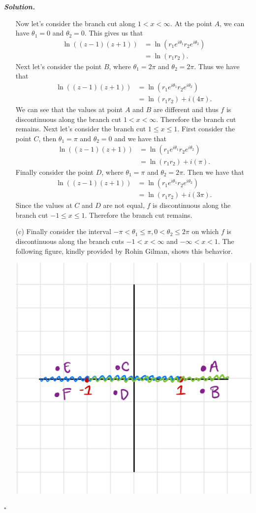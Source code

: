 \documentclass[12pt]{report}
\newenvironment{solution}[1][\it{Solution}]{\textbf{#1. } }{$\square$}
\begin{document}
\begin{solution}
\begin{enumerate}
        Now let's consider the branch cut along $1 < x < \infty$. At the point $A$, we can have $\theta_1 = 0$ and $\theta_2 = 0$. This gives us that
        \begin{align*}
            \ln((z-1)(z+1)) &= \ln(r_1e^{i\theta_1}r_2e^{i\theta_2})\\
            &=\ln(r_1r_2).
        \end{align*}
        Next let's consider the point $B$, where $\theta_1 = 2\pi$ and $\theta_2 = 2\pi$. Thus we have that
        \begin{align*}
            \ln((z-1)(z+1)) &= \ln(r_1e^{i\theta_1}r_2e^{i\theta_2})\\
            &=\ln(r_1r_2) + i(4\pi).
        \end{align*}
        We can see that the values at point $A$ and $B$ are different and thus $f$ is discontinuous along the branch cut $1 < x < \infty$. Therefore the branch cut remains.  Next let's consider the branch cut $1 \leq x \leq 1$. First consider the point $C$, then $\theta_1 = \pi$ and $\theta_2 = 0$ and we have that
        \begin{align*}
            \ln((z-1)(z+1)) &= \ln(r_1e^{i\theta_1}r_2e^{i\theta_2})\\
            &=\ln(r_1r_2) + i(\pi).
        \end{align*}
        Finally consider the point $D$, where $\theta_1 = \pi$ and $\theta_2 = 2\pi$. Then we have that
        \begin{align*}
            \ln((z-1)(z+1)) &= \ln(r_1e^{i\theta_1}r_2e^{i\theta_2})\\
            &=\ln(r_1r_2) + i(3\pi).
        \end{align*}
        Since the values at $C$ and $D$ are not equal, $f$ is discontinuous along the branch cut $-1\leq x\leq 1$. Therefore the branch cut remains. 


        \item [(c)]
        Finally consider the interval $-\pi < \theta_1 \leq \pi, 0 < \theta_2 \leq 2 \pi$ on which $f$ is discontinuous along the branch cuts $-1 < x < \infty$ and $-\infty < x < 1$. The following figure, kindly provided by Rohin Gilman, shows this behavior.

        \begin{center}
            \includegraphics[width=.5\textwidth]{figures/3c.png}
        \end{center}
        

\end{enumerate}
\end{solution}
\end{document}
